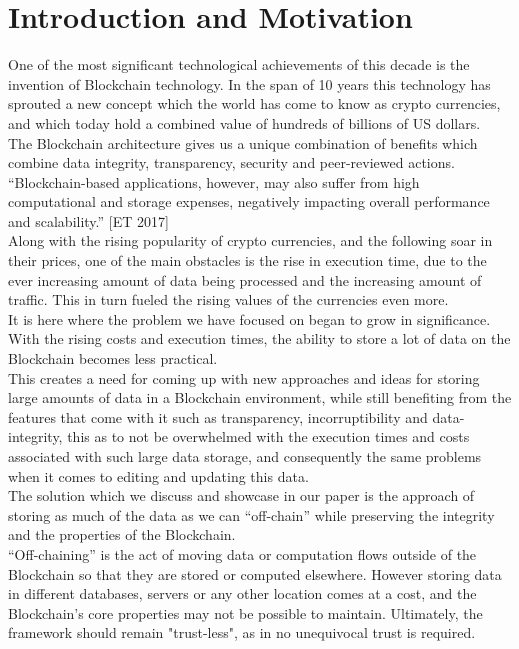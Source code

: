 \section{Introduction and Motivation}

One of the most significant technological achievements of this decade is the invention of Blockchain technology. In the span of 10 years this technology has sprouted a new concept which the world has come to know as crypto currencies, and which today hold a combined value of hundreds of billions of US dollars. \\

The Blockchain architecture gives us a unique combination of benefits which combine data integrity, transparency, security and peer-reviewed actions.
“Blockchain-based applications, however, may also suffer from high computational and storage expenses, negatively impacting overall performance and scalability.” [ET 2017]\\

Along with the rising popularity of crypto currencies, and the following soar in their prices, one of the main obstacles is the rise in execution time, due to the ever increasing amount of data being processed and the increasing amount of traffic. This in turn fueled the rising values of the currencies even more.  \\

It is here where the problem we have focused on began to grow in significance. With the rising costs and execution times, the ability to store a lot of data on the Blockchain becomes less practical. \\

This creates a need for coming up with new approaches and ideas for storing large amounts of data in a Blockchain environment, while still benefiting from the features that come with it such as transparency, incorruptibility and data-integrity, this as to not be overwhelmed with the execution times and costs associated with such large data storage, and consequently the same problems when it comes to editing and updating this data.  \\


The solution which we discuss and showcase in our paper is the approach of storing as much of the data as we can “off-chain” while preserving the integrity and the properties of the Blockchain.\\

“Off-chaining” is the act of moving data or computation flows outside of the Blockchain so that they are stored or computed elsewhere. However storing data in different databases, servers or any other location comes at a cost, and the Blockchain’s core properties may not be possible to maintain. Ultimately, the framework should remain "trust-less", as in no unequivocal trust is required.\\

